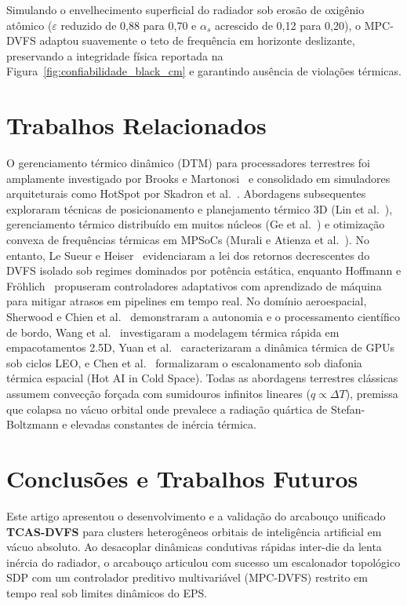 \documentclass[journal]{IEEEtran}
\begin{document}
Simulando o envelhecimento superficial do radiador sob erosão de oxigênio atômico ($\varepsilon$ reduzido de 0,88 para 0,70 e $\alpha_s$ acrescido de 0,12 para 0,20), o MPC-DVFS adaptou suavemente o teto de frequência em horizonte deslizante, preservando a integridade física reportada na Figura~\ref{fig:confiabilidade_black_cm} e garantindo ausência de violações térmicas.

\section{Trabalhos Relacionados}
O gerenciamento térmico dinâmico (DTM) para processadores terrestres foi amplamente investigado por Brooks e Martonosi~\cite{brooks2001dtm} e consolidado em simuladores arquiteturais como HotSpot por Skadron et al.~\cite{skadron2004hotspot}. Abordagens subsequentes exploraram técnicas de posicionamento e planejamento térmico 3D (Lin et al.~\cite{lin2021thermal}), gerenciamento térmico distribuído em muitos núcleos (Ge et al.~\cite{ge2010distributed}) e otimização convexa de frequências térmicas em MPSoCs (Murali e Atienza et al.~\cite{murali2007convex}). No entanto, Le Sueur e Heiser~\cite{lesueur2010dvfs} evidenciaram a lei dos retornos decrescentes do DVFS isolado sob regimes dominados por potência estática, enquanto Hoffmann e Fr{\"o}hlich~\cite{hoffmann2021online} propuseram controladores adaptativos com aprendizado de máquina para mitigar atrasos em pipelines em tempo real. No domínio aeroespacial, Sherwood e Chien et al.~\cite{sherwood2003ase} demonstraram a autonomia e o processamento científico de bordo, Wang et al.~\cite{wang2025packaging} investigaram a modelagem térmica rápida em empacotamentos 2.5D, Yuan et al.~\cite{yuan2025heat} caracterizaram a dinâmica térmica de GPUs sob ciclos LEO, e Chen et al.~\cite{chen2026hotai} formalizaram o escalonamento sob diafonia térmica espacial (Hot AI in Cold Space). Todas as abordagens terrestres clássicas assumem convecção forçada com sumidouros infinitos lineares ($q \propto \Delta T$), premissa que colapsa no vácuo orbital onde prevalece a radiação quártica de Stefan-Boltzmann e elevadas constantes de inércia térmica.

\section{Conclusões e Trabalhos Futuros}
Este artigo apresentou o desenvolvimento e a validação do arcabouço unificado \textbf{TCAS-DVFS} para clusters heterogêneos orbitais de inteligência artificial em vácuo absoluto. Ao desacoplar dinâmicas condutivas rápidas inter-die da lenta inércia do radiador, o arcabouço articulou com sucesso um escalonador topológico SDP com um controlador preditivo multivariável (MPC-DVFS) restrito em tempo real sob limites dinâmicos do EPS.
\end{document}
